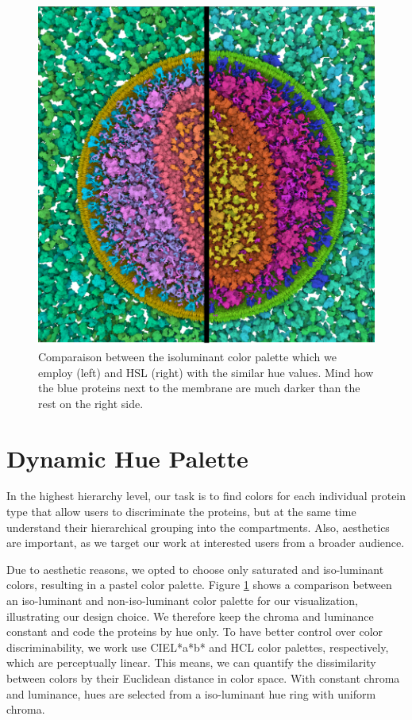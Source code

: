 \documentclass[review,journal]{vgtc}         %
\begin{document}
	\begin{figure}
\centering
\includegraphics[width=0.7\linewidth]{Figures/hslvshcl}
\caption{Comparaison between the isoluminant color palette which we employ (left) and HSL (right) with the similar hue values. Mind how the blue proteins next to the membrane are much darker than the rest on the right side.}
\label{fig:hslvshcl}
\end{figure}

	
	\section{Dynamic Hue Palette}
	\label{sec:hue}
	
	In the highest hierarchy level, our task is to find colors for each individual protein type that allow users to discriminate the proteins, but at the same time understand their hierarchical grouping into the compartments. 
	Also, aesthetics are important, as we target our work at interested users from a broader audience. 
	
	Due to aesthetic reasons, we opted to choose only saturated and iso-luminant colors, resulting in a pastel color palette. 
	Figure \ref{fig:hslvshcl} shows a comparison between an iso-luminant and non-iso-luminant color palette for our visualization, illustrating our design choice. 
	We therefore keep the chroma and luminance constant and code the proteins by hue only. 
	To have better control over color discriminability, we work use CIEL*a*b* and HCL color palettes, respectively, which are perceptually linear. 
	This means, we can quantify the dissimilarity between colors by their Euclidean distance in color space. 
	With constant chroma and luminance, hues are selected from a iso-luminant hue ring with uniform chroma. 
	
\end{document}
